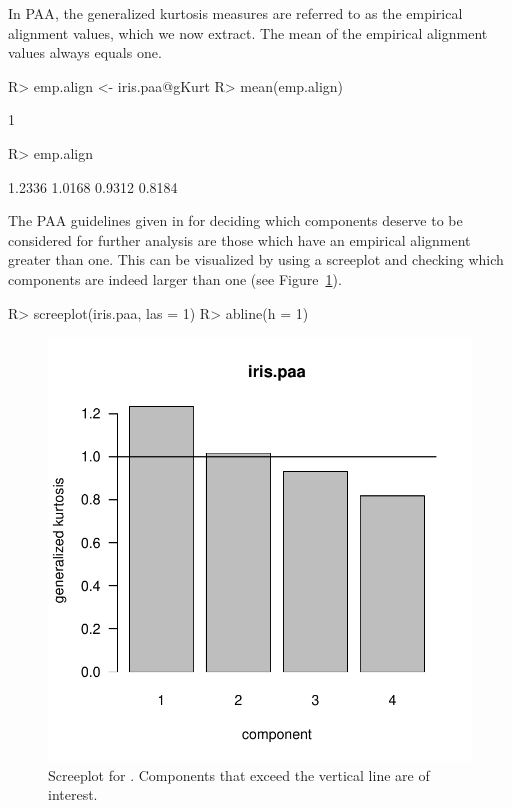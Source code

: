 \documentclass[article,nojss]{jss}
\begin{document}
In {PAA}, the generalized kurtosis measures are referred to as the empirical alignment values, which we now
extract.  The mean of the empirical alignment values always equals one.
\begin{Schunk}
\begin{Sinput}
R> emp.align <- iris.paa@gKurt
R> mean(emp.align)
\end{Sinput}
\begin{Soutput}
[1] 1
\end{Soutput}
\begin{Sinput}
R> emp.align
\end{Sinput}
\begin{Soutput}
[1] 1.2336 1.0168 0.9312 0.8184
\end{Soutput}
\end{Schunk}

The {PAA} guidelines given in \citet{Critchley2008} for deciding which components deserve to be considered for
further analysis are those which have an empirical alignment greater than one. This can be visualized by using a
screeplot and checking which components are
indeed larger than one (see Figure~\ref{Iris_PAA}).
\begin{Schunk}
\begin{Sinput}
R> screeplot(iris.paa, las = 1)
R> abline(h = 1)
\end{Sinput}
\end{Schunk}

\begin{figure}[t]
\begin{center}
\includegraphics{ICS-026}
\caption{Screeplot for . Components that exceed the vertical line are of interest.}
\label{Iris_PAA}
\end{center}
\end{figure}
\end{document}
